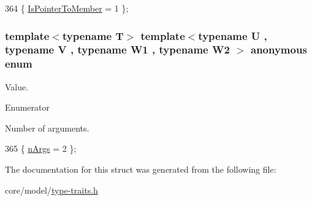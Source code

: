 \begin{DoxyCode}
364 \{ \hyperlink{structTypeTraits_1_1PtrToMemberTraits_3_01U_07V_1_1_5_08_07W1_00_01W2_08_4_aaa7045aefbea304f8ef365a035f0f007a3a0e9d0078f16918b44d01cfef20d34f}{IsPointerToMember} = 1    \};
\end{DoxyCode}
\subsubsection[{\texorpdfstring{anonymous enum}{anonymous enum}}]{\setlength{\rightskip}{0pt plus 5cm}template$<$typename T$>$ template$<$typename U , typename V , typename W1 , typename W2 $>$ anonymous enum}\hypertarget{structTypeTraits_1_1PtrToMemberTraits_3_01U_07V_1_1_5_08_07W1_00_01W2_08_4_a26b4957758c07d0e7b8660bd80799fc8}{}\label{structTypeTraits_1_1PtrToMemberTraits_3_01U_07V_1_1_5_08_07W1_00_01W2_08_4_a26b4957758c07d0e7b8660bd80799fc8}
Value. \begin{Desc}
\item[Enumerator]\par
\begin{description}
\item[{\em 
n\+Args\hypertarget{structTypeTraits_1_1PtrToMemberTraits_3_01U_07V_1_1_5_08_07W1_00_01W2_08_4_a26b4957758c07d0e7b8660bd80799fc8aeafd6dc51924a9a590918a7a087263e4}{}\label{structTypeTraits_1_1PtrToMemberTraits_3_01U_07V_1_1_5_08_07W1_00_01W2_08_4_a26b4957758c07d0e7b8660bd80799fc8aeafd6dc51924a9a590918a7a087263e4}
}]Number of arguments. \end{description}
\end{Desc}

\begin{DoxyCode}
365 \{ \hyperlink{structTypeTraits_1_1PtrToMemberTraits_3_01U_07V_1_1_5_08_07W1_00_01W2_08_4_a26b4957758c07d0e7b8660bd80799fc8aeafd6dc51924a9a590918a7a087263e4}{nArgs} = 2                \};
\end{DoxyCode}


The documentation for this struct was generated from the following file\+:\begin{DoxyCompactItemize}
\item 
core/model/\hyperlink{type-traits_8h}{type-\/traits.\+h}\end{DoxyCompactItemize}
